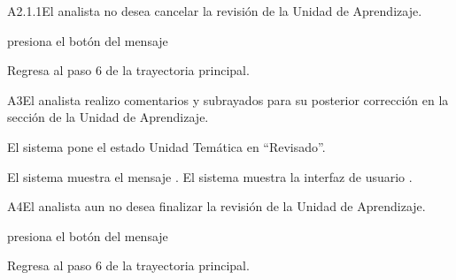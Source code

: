 	
\begin{UCtrayectoriaA}{A2.1.1}{El analista no desea cancelar la revisión de la Unidad de Aprendizaje.} 

	\hypertarget{SP2-CU10-A2.1.1}{\UCpaso[\UCactor] presiona el botón  del mensaje }
    \UCpaso Regresa al paso 6 de la trayectoria principal. 
\end{UCtrayectoriaA}

	
\begin{UCtrayectoriaA}{A3}{El analista realizo comentarios y subrayados para su posterior corrección en la sección de la Unidad de Aprendizaje.} 

	\hypertarget{SP2-CU10-A3}{\UCpaso El sistema pone el estado Unidad Temática en “Revisado”.}
    \UCpaso El sistema muestra el mensaje .
    \UCpaso El sistema muestra la interfaz de usuario .
\end{UCtrayectoriaA}

	
\begin{UCtrayectoriaA}{A4}{El analista aun no desea finalizar la revisión de la Unidad de Aprendizaje.} 

	\hypertarget{SP2-CU10-A4}{\UCpaso[\UCactor] presiona el botón  del mensaje }
    \UCpaso Regresa al paso 6 de la trayectoria principal. 
\end{UCtrayectoriaA}